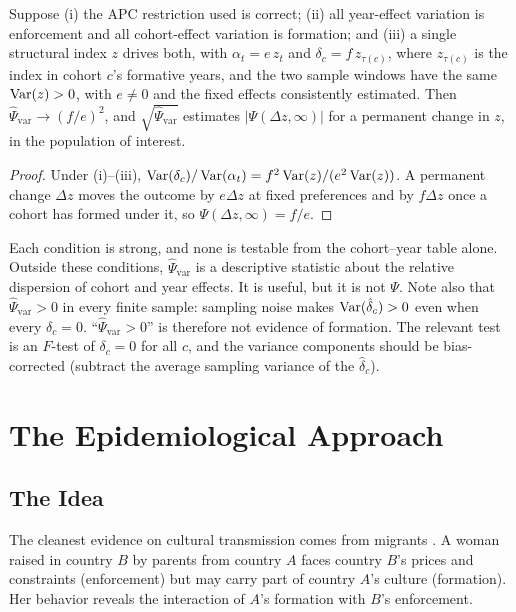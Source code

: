 \documentclass[../structural_economics_book.tex]{subfiles}
\begin{document}
\begin{proposition}\label{ch11:prop:psivar_map}
Suppose (i) the APC restriction used is correct; (ii) all year-effect variation is enforcement and all cohort-effect variation is formation; and (iii) a single structural index $z$ drives both, with $\alpha_t = e\,z_t$ and $\delta_c = f\,z_{\tau(c)}$, where $z_{\tau(c)}$ is the index in cohort $c$'s formative years, and the two sample windows have the same $\operatorname{Var}(z) > 0$, with $e \neq 0$ and the fixed effects consistently estimated. Then $\hat{\Psi}_{\text{var}} \to (f/e)^2$, and $\sqrt{\hat{\Psi}_{\text{var}}}$ estimates $|\Psi(\Delta z, \infty)|$ for a permanent change in $z$, in the population of interest.
\end{proposition}

\begin{proof}
Under (i)--(iii), $\operatorname{Var}(\delta_c)/\operatorname{Var}(\alpha_t) = f^2\operatorname{Var}(z)/(e^2\operatorname{Var}(z))$. A permanent change $\Delta z$ moves the outcome by $e\Delta z$ at fixed preferences and by $f\Delta z$ once a cohort has formed under it, so $\Psi(\Delta z, \infty) = f/e$.
\end{proof}

Each condition is strong, and none is testable from the cohort--year table alone. Outside these conditions, $\hat{\Psi}_{\text{var}}$ is a descriptive statistic about the relative dispersion of cohort and year effects. It is useful, but it is not $\Psi$. Note also that $\hat{\Psi}_{\text{var}} > 0$ in every finite sample: sampling noise makes $\operatorname{Var}(\hat{\delta}_c) > 0$ even when every $\delta_c = 0$. ``$\hat{\Psi}_{\text{var}} > 0$'' is therefore not evidence of formation. The relevant test is an $F$-test of $\delta_c = 0$ for all $c$, and the variance components should be bias-corrected (subtract the average sampling variance of the $\hat{\delta}_c$).


\section{The Epidemiological Approach}
\label{ch11:sec:epidemiological}

\subsection{The Idea}

The cleanest evidence on cultural transmission comes from migrants \citep{fernandez2011does}. A woman raised in country $B$ by parents from country $A$ faces country $B$'s prices and constraints (enforcement) but may carry part of country $A$'s culture (formation). Her behavior reveals the interaction of $A$'s formation with $B$'s enforcement.
\end{document}
